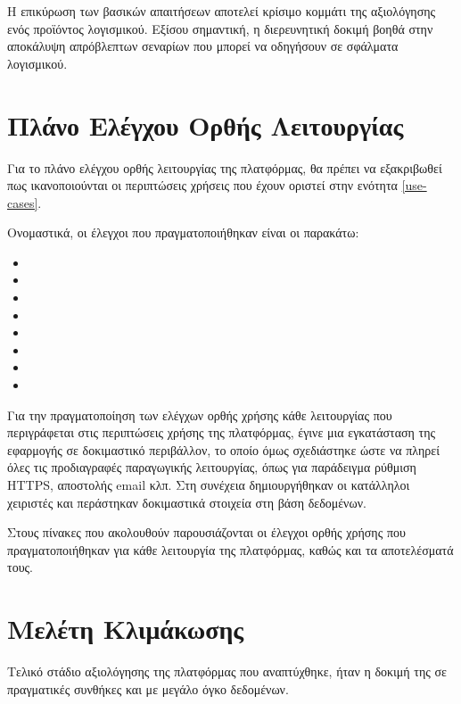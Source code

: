 Η επικύρωση των βασικών απαιτήσεων αποτελεί κρίσιμο κομμάτι της αξιολόγησης ενός προϊόντος λογισμικού. Εξίσου σημαντική, η διερευνητική δοκιμή βοηθά στην αποκάλυψη απρόβλεπτων σεναρίων που μπορεί να οδηγήσουν σε σφάλματα λογισμικού.

\section{Πλάνο Ελέγχου Ορθής Λειτουργίας}
Για το πλάνο ελέγχου ορθής λειτουργίας της πλατφόρμας, θα πρέπει να εξακριβωθεί πως ικανοποιούνται οι περιπτώσεις χρήσεις που έχουν οριστεί στην ενότητα \ref{use-cases}.

Ονομαστικά, οι έλεγχοι που πραγματοποιήθηκαν είναι οι παρακάτω:

\begin{itemize}
	\item {}
	\item {}
	\item {}
	\item {}
	\item {}
	\item {}
	\item {}
	\item {}
\end{itemize}

Για την πραγματοποίηση των ελέγχων ορθής χρήσης κάθε λειτουργίας που περιγράφεται στις περιπτώσεις χρήσης της πλατφόρμας, έγινε μια εγκατάσταση της εφαρμογής σε δοκιμαστικό περιβάλλον, το οποίο όμως σχεδιάστηκε ώστε να πληρεί όλες τις προδιαγραφές παραγωγικής λειτουργίας, όπως για παράδειγμα ρύθμιση HTTPS, αποστολής email κλπ. Στη συνέχεια δημιουργήθηκαν οι κατάλληλοι χειριστές και περάστηκαν δοκιμαστικά στοιχεία στη βάση δεδομένων.

Στους πίνακες που ακολουθούν παρουσιάζονται οι έλεγχοι ορθής χρήσης που πραγματοποιήθηκαν για κάθε λειτουργία της πλατφόρμας, καθώς και τα αποτελέσματά τους.

\FloatBarrier

\FloatBarrier

\section{Μελέτη Κλιμάκωσης}
Τελικό στάδιο αξιολόγησης της πλατφόρμας που αναπτύχθηκε, ήταν η δοκιμή της σε πραγματικές συνθήκες και με μεγάλο όγκο δεδομένων.

